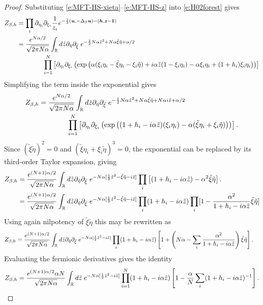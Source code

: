 \documentclass[11pt]{amsart}
\numberwithin{equation}{section}
\numberwithin{theorem}{section}
\newcommand{\V}[1]{\boldsymbol{#1}}
\begin{document}
\begin{proof}
Substituting \eqref{e:MFT-HS-xieta}--\eqref{e:MFT-HS-z} into \eqref{e:H02forest} gives
\begin{align}
  Z_{\beta,h}
  &= \prod_i \partial_{\eta_i} \partial_{\xi_i} \frac{1}{z_i} e^{-\frac12 (\V{u},-\Delta_\beta \V{u})-(\V{h},\V{z}-\V{1})}
    \nnb
  &=
  \frac{e^{N\alpha/2}}{\sqrt{2\pi N\alpha}}
  \int_{\R} d
  \tilde z \partial_{\tilde \eta} \partial_{\tilde \xi} \;
    e^{-\frac12 N\alpha \tilde z^2 + N\alpha \tilde\xi\tilde\eta+\alpha/2}
    \nnb
    &\qquad\qquad
    \prod_{i=1}^N \qa{\partial_{\eta_i}\partial_{\xi_i} \pa{
    \exp\pa{\alpha(\xi_i\eta_i-\tilde\xi\eta_i-\xi_i\tilde\eta)+i\alpha \tilde z (1-\xi_i\eta_i)-\alpha \xi_i\eta_i+(1+h_i)\xi_i\eta_i}}}
\end{align}
Simplifying the term inside the exponential gives
\begin{align}
  Z_{\beta,h}
&=
  \frac{e^{N\alpha/2}}{\sqrt{2\pi N\alpha}}
  \int_{\mathbb{R}} d
  \tilde z \partial_{\tilde \eta} \partial_{\tilde \xi} \;
    e^{-\frac12 N\alpha \tilde z^2 + N\alpha \tilde\xi\tilde\eta+N\alpha i\tilde z+\alpha/2}
    \nonumber\\
    &\qquad\qquad
    \prod_{i=1}^N \left[{\partial_{\eta_i}\partial_{\xi_i} \left({
    \exp\left({(1+h_i-i\alpha\tilde z)(\xi_i\eta_i)-\alpha(\tilde\xi\eta_i+\xi_i\tilde\eta)}\right)}\right)}\right].
\end{align}
Since $(\tilde\xi\tilde\eta)^2=0$ and $(\tilde\xi\eta_i+\xi_i\tilde\eta)^3=0$,
the exponential can be replaced by its third-order Taylor expansion, giving
\begin{align}
  Z_{\beta,h}
  &=
  \frac{e^{(N+1)\alpha/2}}{\sqrt{2\pi N\alpha}}
  \int_{\mathbb{R}} d
  \tilde z \partial_{\tilde \eta} \partial_{\tilde \xi} \;
    e^{-N\alpha [\frac12\tilde z^2 - \tilde\xi\tilde\eta- i\tilde z]}
    \prod_{i} \left[{
    (1+h_i-i\alpha\tilde z) - \alpha^2\tilde\xi\tilde\eta}\right].
    \nonumber\\
    &=
  \frac{e^{(N+1)\alpha/2}}{\sqrt{2\pi N\alpha}}
  \int_{\mathbb{R}} d
  \tilde z \partial_{\tilde \eta} \partial_{\tilde \xi} \;
    e^{-N\alpha [\frac12\tilde z^2 - \tilde\xi\tilde\eta- i\tilde z]}
    \prod_{i}
    (1+h_i-i\alpha\tilde z) \prod_{i} [1 - \frac{\alpha^2}{1+h_i-i\alpha\tilde z} \tilde\xi\tilde\eta]
\end{align}
Using again nilpotency of $\tilde\xi\tilde\eta$ this may be rewritten as
\begin{align}
  Z_{\beta,h}
  &=
    \label{E:HS}
  \frac{e^{(N+1)\alpha/2}}{\sqrt{2\pi N\alpha}}
  \int_{\mathbb{R}} d
  \tilde z \partial_{\tilde \eta} \partial_{\tilde \xi} \;
    e^{-N\alpha [\frac12\tilde z^2- i\tilde z]}
    \prod_{i}
    (1+h_i-i\alpha\tilde z) \left[{1 + \left({N\alpha- \sum_{i} \frac{\alpha^2}{1+h_i-i\alpha\tilde z}}\right) \tilde\xi\tilde\eta}\right]
    .
\end{align}
Evaluating the fermionic derivatives gives the identity
\begin{equation} \label{e:Z-generalh}
  Z_{\beta,h}=
  \frac{e^{(N+1)\alpha/2}\alpha N}{\sqrt{2\pi N\alpha}}
  \int_{\mathbb{R}} d
  \tilde z  \;
    e^{-N\alpha [\frac12\tilde z^2 - i\tilde z]}
    \prod_{i=1}^N
    (1+h_i-i\alpha\tilde z)\left[{1 - \frac{\alpha}{N}\sum_i (1+h_i-i\alpha\tilde z)^{-1}}\right].
\end{equation}


\end{proof}
\end{document}
